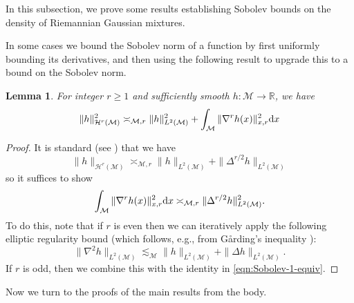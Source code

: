 \documentclass[preprint]{imsart}
\theoremstyle{plain}
\newtheorem{lemma}[theorem]{Lemma}
\theoremstyle{definition}
\newcommand{\Rbb}{\mathbb{R}}
\newcommand{\Mcal}{\mathcal{M}}
\newcommand{\Hcal}{\mathcal{H}}
\newcommand{\diff}{\textnormal{d}}
\DeclareMathOperator{\diam}{diam}
\begin{document}
\begin{appendix}
In this subsection, we prove some results establishing Sobolev bounds on the density of Riemannian Gaussian mixtures.

In some cases we bound the Sobolev norm of a function by first uniformly bounding its derivatives, and then using the following result to upgrade this to a bound on the Sobolev norm. 

\begin{lemma}\label{lem:equiv-Sobolev-defs}
    For integer $r\ge 1$ and sufficiently smooth $h:\Mcal\to\Rbb$, we have
    \begin{equation*}
        \|h\|^2_{\Hcal^r(\Mcal)} \asymp_{\Mcal,r}\|h\|^2_{L^2(\Mcal)}+\int_{\Mcal}\|\nabla^rh(x)\|_{x,r}^2\diff x
    \end{equation*}
\end{lemma}

\begin{proof}
    It is standard (see \cite[Chapter~2]{Aubin}) that we have 
    \begin{equation*}
        \|h\|_{\Hcal^r(\Mcal)} \asymp_{\Mcal,r}\|h\|_{L^2(\Mcal)}+\|\Delta^{r/2}h\|_{L^2(\Mcal)}
    \end{equation*}
    so it suffices to show
    \begin{equation*}
        \int_{\Mcal}\|\nabla^rh(x)\|_{x,r}^2\diff x\asymp_{\Mcal,r}\|\Delta^{r/2}h\|_{L^2(\Mcal)}^2.
    \end{equation*}
    To do this, note that if $r$ is even then we can iteratively apply the following elliptic regularity bound (which follows, e.g., from G{\aa}rding's inequality \cite[Chapter 7.6, Vol II]{TaylorPDE}):
    \begin{equation*}
        \|\nabla^2h\|_{L^2(\Mcal)} \lesssim_{\Mcal}\|h\|_{L^2(\Mcal)}+\|\Delta h\|_{L^2(\Mcal)}.
    \end{equation*}
    If $r$ is odd, then we combine this with the identity in \eqref{eqn:Sobolev-1-equiv}.
\end{proof}

Now we turn to the proofs of the main results from the body.




\end{appendix}
\end{document}
